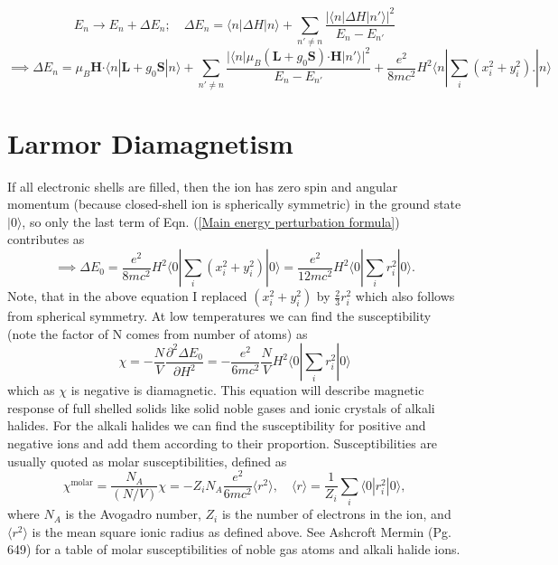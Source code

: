 \documentclass{article}
\begin{document}
\begin{equation}
E_n \to E_n + \Delta E_n; \quad \Delta E_n = \langle n | \Delta H |n\rangle + \sum_{n' \neq n} \frac{| \langle n | \Delta H |n' \rangle |^2}{E_n - E_{n'}}
\end{equation}
\begin{equation}\label{Main energy perturbation formula}
\implies  \Delta E_n =\mu_B \mathbf{H}\mathbf{ \cdot} \langle n | \mathbf{L}+ g_0 \mathbf{S} |n\rangle + \sum_{n' \neq n} \frac{| \langle n | \mu_B (\mathbf{L}+ g_0 \mathbf{S})\mathbf{ \cdot} \mathbf{H}|n' \rangle |^2}{E_n - E_{n'}}+ \frac{e^2}{8mc^2} H^2 \langle n |  \sum_i (x_i ^2 + y_i ^2). |n\rangle
\end{equation}

\section{Larmor Diamagnetism}
If all electronic shells are filled, then the ion has zero spin and angular momentum (because closed-shell ion is spherically symmetric) in the ground state $|0\rangle$, so only the last term of Eqn. (\ref{Main energy perturbation formula}) contributes as
\begin{equation}
\implies  \Delta E_0 = \frac{e^2}{8mc^2} H^2 \langle 0 |  \sum_i (x_i ^2 + y_i ^2) |0\rangle =  \frac{e^2}{12mc^2} H^2 \langle 0 |  \sum_i r_i ^2 |0\rangle.
\end{equation}
Note, that in the above equation I replaced $(x_i ^2 + y_i ^2)$ by $\frac{2}{3} r_i ^2 $ which also follows from spherical symmetry. At low temperatures we can find the susceptibility (note the factor of N comes from number of atoms) as
\begin{equation}
\chi =  -\frac{N}{V}\frac{\partial^2 \Delta E_0 }{\partial H^2}=   -\frac{e^2}{6mc^2} \frac{N}{V} H^2 \langle 0 |  \sum_i r_i ^2 |0\rangle
\end{equation}
which as $\chi$ is negative is diamagnetic. This equation will describe magnetic response of full shelled solids  like solid noble gases and ionic crystals of alkali halides. For the alkali halides we can find the susceptibility for positive and negative ions and add them according to their proportion. Susceptibilities are usually quoted as molar susceptibilities, defined as
\begin{equation}
\chi^{\mathrm{molar}} = \frac{N_A}{(N/V)} \chi = -Z_i N_A \frac{e^2}{6mc^2} \langle r^2 \rangle, \quad \langle r\rangle = \frac{1}{Z_i} \sum_i \langle 0 |   r_i ^2 |0\rangle,
\end{equation}
where $N_A$ is the Avogadro number, $Z_i$ is the number of electrons in the ion, and $\langle r^2 \rangle$ is the mean square ionic radius as defined above. See Ashcroft Mermin (Pg. 649) for a table of molar susceptibilities of noble gas atoms and alkali halide ions.
\end{document}
